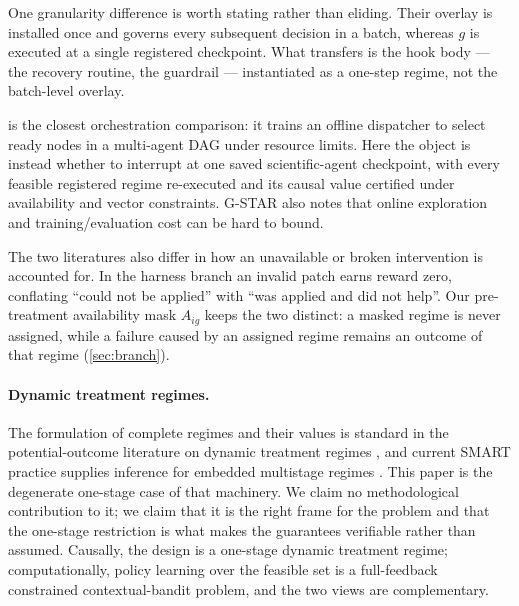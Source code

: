 One granularity difference is worth stating rather than eliding.  Their overlay
is installed once and governs every subsequent decision in a batch, whereas $g$
is executed at a single registered checkpoint.  What transfers is the hook body
--- the recovery routine, the guardrail --- instantiated as a one-step regime,
not the batch-level overlay.

\citet{gstar2026} is the closest orchestration comparison: it trains an offline
dispatcher to select ready nodes in a multi-agent DAG under resource limits.
Here the object is instead whether to interrupt at one saved scientific-agent
checkpoint, with every feasible registered regime re-executed and its causal
value certified under availability and vector constraints.  G-STAR also notes
that online exploration and training/evaluation cost can be hard to bound.

The two literatures also differ in how an unavailable or broken intervention is
accounted for.  In the harness branch an invalid patch earns reward zero,
conflating ``could not be applied'' with ``was applied and did not help''.  Our
pre-treatment availability mask $A_{ig}$ keeps the two distinct: a masked regime
is never assigned, while a failure caused by an assigned regime remains an
outcome of that regime (\cref{sec:branch}).

\paragraph{Dynamic treatment regimes.}
The formulation of complete regimes and their values is standard in the
potential-outcome literature on dynamic treatment regimes
\citep{murphy2003,murphybingham2009}, and current SMART practice supplies
inference for embedded multistage regimes \citep{tsiatis2024}.  This paper is
the degenerate one-stage case of that machinery.  We claim no methodological
contribution to it; we claim that it is the right frame for the problem and that
the one-stage restriction is what makes the guarantees verifiable rather than
assumed.  Causally, the design is a one-stage dynamic treatment regime;
computationally, policy learning over the feasible set is a full-feedback
constrained contextual-bandit problem, and the two views are complementary.

